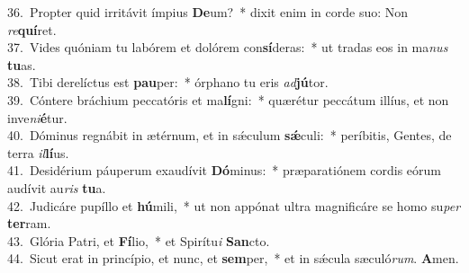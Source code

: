 {36.~}Propter quid irritávit ímpius \textbf{De}um?~* dixit enim in corde suo: Non \textit{re}\textbf{quí}ret.\\
{37.~}Vides quóniam tu labórem et dolórem con\textbf{sí}deras:~* ut tradas eos in ma\textit{nus} \textbf{tu}as.\\
{38.~}Tibi derelíctus est \textbf{pau}per:~* órphano tu eris \textit{ad}\textbf{jú}tor.\\
{39.~}Cóntere bráchium peccatóris et ma\textbf{lí}gni:~* quærétur peccátum illíus, et non inve\textit{ni}\textbf{é}tur.\\
{40.~}Dóminus regnábit in ætérnum, et in sǽculum \textbf{sǽ}culi:~* períbitis, Gentes, de terra \textit{il}\textbf{lí}us.\\
{41.~}Desidérium páuperum exaudívit \textbf{Dó}minus:~* præparatiónem cordis eórum audívit au\textit{ris} \textbf{tu}a.\\
{42.~}Judicáre pupíllo et \textbf{hú}mili,~* ut non appónat ultra magnificáre se homo su\textit{per} \textbf{ter}ram.\\
{43.~}Glória Patri, et \textbf{Fí}lio,~* et Spirítu\textit{i} \textbf{San}cto.\\
{44.~}Sicut erat in princípio, et nunc, et \textbf{sem}per,~* et in sǽcula sæculó\textit{rum}. \textbf{A}men.\\
